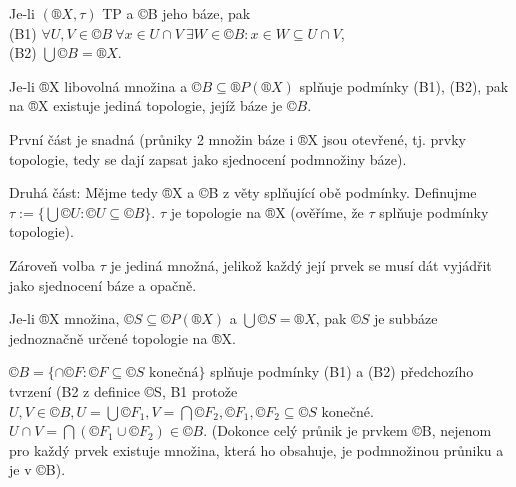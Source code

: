 \documentclass[12pt]{article}					%
\begin{document}
    \begin{tvrzeni}
        Je-li $(®X, \tau)$ TP a ©B jeho báze, pak\\
        (B1) $\forall U, V \in ©B\ \forall x \in U \cap V\ \exists W \in ©B: x \in W \subseteq U \cap V$,\\
        (B2) $\bigcup ©B = ®X$.

        Je-li ®X libovolná množina a $©B \subseteq ®P(®X)$ splňuje podmínky (B1), (B2), pak na ®X existuje jediná topologie, jejíž báze je $©B$.

        \begin{dukazin}
            První část je snadná (průniky 2 množin báze i ®X jsou otevřené, tj. prvky topologie, tedy se dají zapsat jako sjednocení podmnožiny báze).

            Druhá část: Mějme tedy ®X a ©B z věty splňující obě podmínky. Definujme $\tau := \{\bigcup ©U: ©U \subseteq ©B\}$. $\tau$ je topologie na ®X (ověříme, že $\tau$ splňuje podmínky topologie).

            Zároveň volba $\tau$ je jediná množná, jelikož každý její prvek se musí dát vyjádřit jako sjednocení báze a opačně.
        \end{dukazin}

        \begin{dusledekin}
            Je-li ®X množina, $©S \subseteq ©P(®X)$ a $\bigcup©S=®X$, pak $©S$ je subbáze jednoznačně určené topologie na ®X.
            \begin{dukazin}
                $©B = \{\cap ©F: ©F \subseteq ©S \text{ konečná}\}$ splňuje podmínky (B1) a (B2) předchozího tvrzení (B2 z definice ©S, B1 protože $U, V \in ©B, U = \bigcup ©F_1, V = \bigcap ©F_2, ©F_1, ©F_2 \subseteq ©S \text{ konečné}$. $U \cap V = \bigcap (©F_1 \cup ©F_2) \in ©B$. (Dokonce celý průnik je prvkem ©B, nejenom pro každý prvek existuje množina, která ho obsahuje, je podmnožinou průniku a je v ©B).
            \end{dukazin}
        \end{dusledekin}
    \end{tvrzeni}
\end{document}
